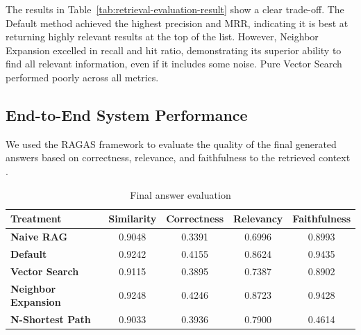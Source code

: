 \documentclass[conference]{IEEEtran}
\begin{document}
The results in Table~\ref{tab:retrieval-evaluation-result} show a clear trade-off.
The Default method achieved the highest precision and MRR, indicating it is best at returning highly relevant results at the top of the list.
However, Neighbor Expansion excelled in recall and hit ratio, demonstrating its superior ability to find all relevant information, even if it includes some noise.
Pure Vector Search performed poorly across all metrics.

\subsection{End-to-End System Performance}
We used the RAGAS framework to evaluate the quality of the final generated answers based on correctness, relevance, and faithfulness to the retrieved context \cite{es2024ragas}.

\begin{table}[htbp]
    \caption{Final answer evaluation}
    \begin{center}
        \begin{tabular}{|p{1.5cm}|c|c|c|c|}
            \hline
            \textbf{Treatment}          & \textbf{Similarity} & \textbf{Correctness} & \textbf{Relevancy} & \textbf{Faithfulness} \\
            \hline
            \textbf{Naive RAG}          & 0.9048              & 0.3391               & 0.6996             & 0.8993                \\
            \hline
            \textbf{Default}            & 0.9242              & 0.4155               & 0.8624             & 0.9435                \\
            \hline
            \textbf{Vector Search}      & 0.9115              & 0.3895               & 0.7387             & 0.8902                \\
            \hline
            \textbf{Neighbor Expansion} & 0.9248              & 0.4246               & 0.8723             & 0.9428                \\
            \hline
            \textbf{N-Shortest Path}    & 0.9033              & 0.3936               & 0.7900             & 0.4614                \\
            \hline
        \end{tabular}
        \label{tab:final-answer-evaluation-result}
    \end{center}
\end{table}
\end{document}
